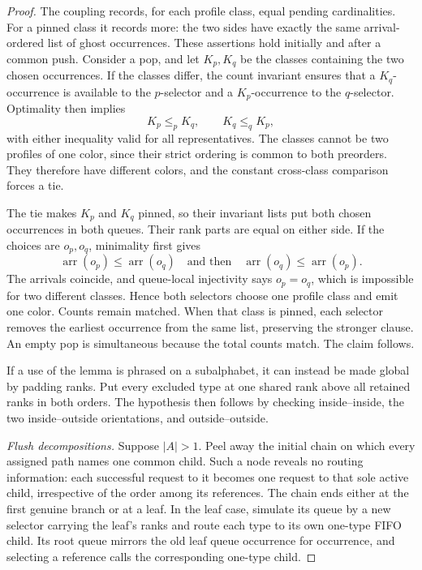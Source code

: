 \documentclass[11pt]{article}
\theoremstyle{definition}
\begin{document}
\begin{proof}
The coupling records, for each profile class, equal pending cardinalities.
For a pinned class it records more: the two sides have exactly the same
arrival-ordered list of ghost occurrences.  These assertions hold initially
and after a common push.  Consider a pop, and let \(K_p,K_q\) be the classes
containing the two chosen occurrences.  If the classes differ, the count
invariant ensures that a \(K_q\)-occurrence is available to the
\(p\)-selector and a \(K_p\)-occurrence to the \(q\)-selector.  Optimality
then implies
\[
  K_p\le_p K_q,\qquad K_q\le_q K_p,
\]
with either inequality valid for all representatives.  The classes cannot
be two profiles of one color, since their strict ordering is common to both
preorders.  They therefore have different colors, and the constant
cross-class comparison forces a tie.

The tie makes \(K_p\) and \(K_q\) pinned, so their invariant lists put both
chosen occurrences in both queues.  Their rank parts are equal on either
side.  If the choices are \(o_p,o_q\), minimality first gives
\[
 \operatorname{arr}(o_p)\le\operatorname{arr}(o_q)
 \quad\text{and then}\quad
 \operatorname{arr}(o_q)\le\operatorname{arr}(o_p).
\]
The arrivals coincide, and queue-local injectivity says \(o_p=o_q\), which
is impossible for two different classes.  Hence both selectors choose one
profile class and emit one color.  Counts remain matched.  When that class
is pinned, each selector removes the earliest occurrence from the same
list, preserving the stronger clause.  An empty pop is simultaneous because
the total counts match.  The claim follows.

If a use of the lemma is phrased on a subalphabet, it can instead be made
global by padding ranks.  Put every excluded type at one shared rank above
all retained ranks in both orders.  The hypothesis then follows by checking
inside--inside, the two inside--outside orientations, and outside--outside.

\medskip
\noindent\textit{Flush decompositions.}
Suppose \(|A|>1\).  Peel away the initial chain on which every assigned path
names one common child.  Such a node reveals no routing information: each
successful request to it becomes one request to that sole active child,
irrespective of the order among its references.  The chain ends either at
the first genuine branch or at a leaf.  In the leaf case, simulate its queue
by a new selector carrying the leaf's ranks and route each type to its own
one-type FIFO child.  Its root queue mirrors the old leaf queue occurrence
for occurrence, and selecting a reference calls the corresponding
one-type child.


\end{proof}
\end{document}
